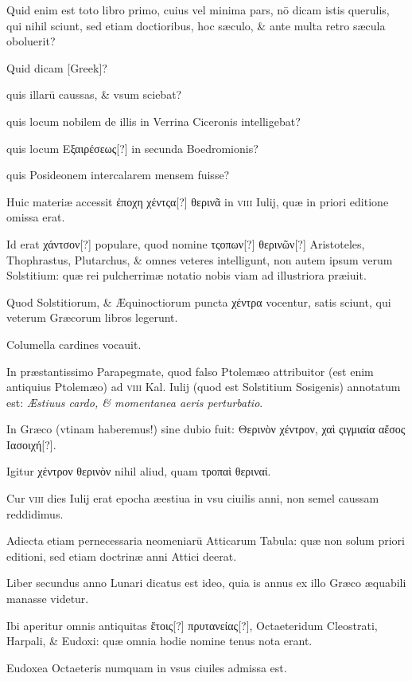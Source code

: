 \begin{parnumbers}
Quid enim est toto libro primo, cuius vel minima
pars, nō dicam istis querulis, qui nihil sciunt, sed etiam doctioribus,
hoc sæculo, \& ante multa retro sæcula oboluerit?

Quid dicam \textgreek{[Greek]}?

quis illarū caussas, \& vsum sciebat?

quis
locum nobilem de illis in Verrina Ciceronis intelligebat?

quis locum
\textgreek{Εξαιρέσεως[?]} in secunda Boedromionis?

quis Posideonem intercalarem
mensem fuisse?

Huic materiæ accessit \textgreek{ἐποχη χέντςα[?] θερινᾶ}
in \textsc{viii} Iulij, quæ in priori editione omissa erat.

Id erat \textgreek{χάντσον[?]}
populare, quod nomine \textgreek{τςοπων[?] θερινῶν[?]} Aristoteles, Thophrastus,
Plutarchus, \& omnes veteres intelligunt, non autem ipsum verum
Solstitium: quæ rei pulcherrimæ notatio nobis viam ad illustriora
præiuit.

Quod Solstitiorum, \& Æquinoctiorum puncta \textgreek{χέντρα} vocentur,
satis sciunt, qui veterum Græcorum libros legerunt.

Columella
cardines vocauit.

In præstantissimo Parapegmate, quod falso
Ptolemæo attribuitor (est enim antiquius Ptolemæo) ad \textsc{viii} Kal.
Iulij (quod est Solstitium Sosigenis) annotatum est: \textit{Æstiuus cardo,
\& momentanea aeris perturbatio}.

In Græco (vtinam haberemus!)
sine dubio fuit: \textgreek{Θερινὸν χέντρον, χαὶ ςιγμιαία αἔσος Ιασοιχή[?]}.

Igitur \textgreek{χέντρον
θερινὸν} nihil aliud, quam \textgreek{τροπαὶ θεριναί}.

Cur \textsc{viii} dies Iulij erat
epocha æestiua in vsu ciuilis anni, non semel caussam reddidimus. 

Adiecta etiam pernecessaria neomeniarū Atticarum Tabula: quæ
non solum priori editioni, sed etiam doctrinæ anni Attici deerat.

Liber secundus anno Lunari dicatus est ideo, quia is annus ex illo
Græco æquabili manasse videtur.

Ibi aperitur omnis antiquitas \textgreek{ἔτοις[?]
πρυτανείας[?]}, Octaeteridum Cleostrati, Harpali, \& Eudoxi: quæ omnia
hodie nomine tenus nota erant.

Eudoxea Octaeteris numquam
in vsus ciuiles admissa est.


\end{parnumbers}
